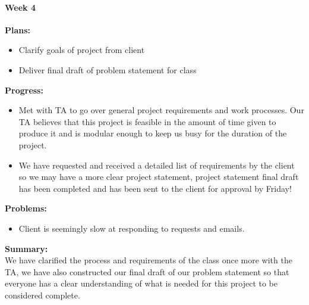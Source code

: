 \paragraph{Week 4}
\begin{adjustwidth}{2.5em}{0pt}
    \vspace{-0.5cm}\textbf{Plans:}
    \vspace{-0.5cm}
    \begin{itemize}
        \item Clarify goals of project from client
        \item Deliver final draft of problem statement for class 
    \end{itemize} 
    \vspace{-0.3cm}\textbf{Progress:}
    \vspace{-0.5cm}
    \begin{itemize}
        \item Met with TA to go over general project requirements and work processes. Our TA believes that this project is feasible in the amount of time given to produce it and is modular enough to keep us busy for the duration of the project.
        \item We have requested and received a detailed list of requirements by the client so we may have a more clear project statement, project statement final draft has been completed and has been sent to  the client for approval by Friday!

    \end{itemize} 
    \vspace{-0.3cm}\textbf{Problems:}
    \vspace{-0.5cm}
    \begin{itemize}
        \item Client is seemingly slow at responding to requests and emails.
    \end{itemize}  
    \vspace{-0.3cm}\noindent\textbf{Summary:}\\
    \noindent We have clarified the process and requirements of the class once more with the TA, we have also constructed our final draft of our problem statement so that everyone has a clear understanding of what is needed for this project to be considered complete.
	\end{adjustwidth} 
